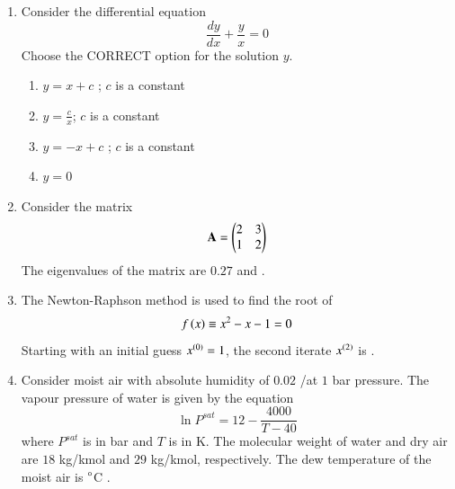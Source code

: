 \documentclass[journal,12pt,onecolumn]{IEEEtran}
\theoremstyle{remark}
\begin{document}
\begin{enumerate}
		\item Consider the differential equation
		\[ \frac{dy}{dx} + \frac{y}{x} = 0 \]
		Choose the CORRECT option for the solution $y$.
		
		\hfill{}
		
		\begin{enumerate}
			\item $y = x + c$ ; $c$ is a constant
			\item $y = \frac{c}{x}$; $c$ is a constant
			\item $y = -x + c$ ; $c$ is a constant
			\item $y = 0$
		\end{enumerate}
		
		\item Consider the matrix
		\begin{align}
		\vec{A} = \myvec{2 & 3 \\ 1 & 2} 
	    \end{align}
		The eigenvalues of the matrix are $0.27$ and \underline{\hspace{2cm}} .
		
		\hfill{}
		
		\item The Newton-Raphson method is used to find the root of
		\[ f\brak{x} \equiv x^2 - x - 1 = 0 \]
		Starting with an initial guess $x^{\brak{0}} = 1$, the second iterate $x^{\brak{2}}$ is \underline{\hspace{2cm}} .
		
		\hfill{}
		
		\item Consider moist air with absolute humidity of $0.02$ /at $1$ bar pressure. The vapour pressure of water is given by the equation
		\[ \ln P^{sat} = 12 - \frac{4000}{T - 40} \]
		where $P^{sat}$ is in bar and $T$ is in K. The molecular weight of water and dry air are $18$ kg/kmol and $29$ kg/kmol, respectively. The dew temperature of the moist air is \underline{\hspace{2cm}} $\degree$C .
		
		\hfill{}
		

\end{enumerate}
\end{document}
